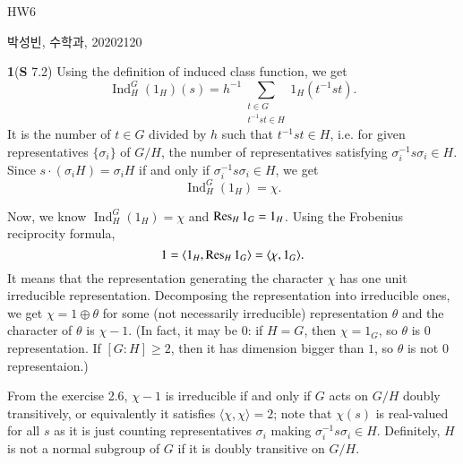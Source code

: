 \documentclass[a4paper, 12pt]{article}
\theoremstyle{Mydefinition}
\theoremstyle{Mytheorem}
\DeclareMathOperator{\Ind}{Ind}
\begin{document}
\thispagestyle{myfirstpage}
\begin{center}
	\Large{HW6}
\end{center}
박성빈, 수학과, 20202120

\noindent \textbf{1}(\textbf{S} 7.2)
Using the definition of induced class function, we get
\begin{equation}
    \Ind_H^G(1_H)(s) = h^{-1}\sum_{\substack{t\in G\\ t^{-1}st\in H}}1_H(t^{-1}st).
\end{equation}
It is the number of $t\in G$ divided by $h$ such that $t^{-1}st\in H$, i.e. for given representatives $\{\sigma_i\}$ of $G/H$, the number of representatives satisfying $\sigma_i^{-1}s\sigma_i\in H$. Since $s\cdot (\sigma_i H) = \sigma_i H$ if and only if $\sigma_i^{-1}s\sigma_i\in H$, we get
\begin{equation}
    \Ind_H^G(1_H) = \chi.
\end{equation}

Now, we know $\Ind_H^G(1_H) = \chi$ and $\Res_H 1_G = 1_H$. Using the Frobenius reciprocity formula,
\begin{equation}
    1 = \langle 1_H, \Res_H 1_G\rangle = \langle \chi, 1_G\rangle.
\end{equation}
It means that the representation generating the character $\chi$ has one unit irreducible representation. Decomposing the representation into irreducible ones, we get $\chi = 1\oplus \theta$ for some (not necessarily irreducible) representation $\theta$ and the character of $\theta$ is $\chi-1$. (In fact, it may be 0: if $H=G$, then $\chi = 1_G$, so $\theta$ is $0$ representation. If $[G:H]\geq 2$, then it has dimension bigger than $1$, so $\theta$ is not $0$ representaion.)

From the exercise 2.6, $\chi-1$ is irreducible if and only if $G$ acts on $G/H$ doubly transitively, or equivalently it satisfies $\langle \chi, \chi\rangle = 2$; note that $\chi(s)$ is real-valued for all $s$ as it is just counting representatives $\sigma_i$ making $\sigma_i^{-1}s\sigma_i\in H$. Definitely, $H$ is not a normal subgroup of $G$ if it is doubly transitive on $G/H$.\\
\end{document}
